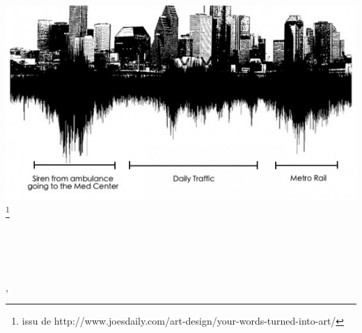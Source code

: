 \begin{titlepage}
    \begin{addmargin}[-1cm]{-3cm}
    \begin{center}
        \large  

        \hfill

        \vfill

        \begingroup
            \color{Maroon}\spacedallcaps{\myTitle} \\ \bigskip
        \endgroup
		\medskip 
		\mySubtitle \\ \bigskip

		\vfill
		
        \includegraphics[scale=.5]{gfx/citySound.jpg}\footnote{issu de http://www.joesdaily.com/art-design/your-words-turned-into-art/} \\ \medskip
		
		\vfill
		
        \spacedlowsmallcaps{\myName}

        \vfill
        
        \myDegree \\ \bigskip
        
        \myDepartment \\                            
        \myFaculty \\
        \myUni , \myLocation\\ \bigskip
		
		\vfill 
		
        \myTime 

        \vfill                      

    \end{center}  
  \end{addmargin}       
\end{titlepage}   